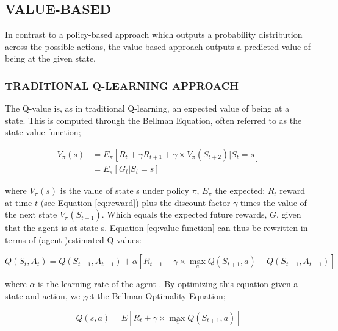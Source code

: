 \documentclass{article}
\let\oldcite\cite
\renewcommand{\cite}[1]{\textbf{\oldcite{#1}}}
\renewenvironment{leftbar}[1][\hsize]{
    \def\FrameCommand{{\color{barcolor}\vrule width 0.5pt \hspace{10pt}}}
    \MakeFramed{\hsize#1 \advance\hsize-\width \FrameRestore}
}{\endMakeFramed}
\begin{document}
\subsection*{\normalsize VALUE-BASED}
\begin{leftbar}
    In contrast to a policy-based approach which outputs a probability distribution across the possible actions, the value-based approach outputs a predicted value of being at the given state. \cite{HF-value}

    \subsubsection*{\hfill TRADITIONAL Q-LEARNING APPROACH}

    The Q-value is, as in traditional Q-learning, an expected value of being at a state. This is computed through the Bellman Equation, often referred to as the state-value function;

    \begin{equation}
        \begin{split}
            V_\pi (s) &= E_\pi \left[ R_t + \gamma R_{t+1} + \gamma \times V_\pi (S_{t+2}) | S_t = s \right] \\
            &= E_\pi \left[ G_t | S_t = s \right]
        \end{split} \label{eq:value-function}
    \end{equation}

    where $V_\pi (s)$ is the value of state s under policy $\pi$, $E_\pi$ the expected: $R_t$ reward at time $t$ (see Equation \eqref{eq:reward}) plus the discount factor $\gamma$ times the value of the next state $V_\pi (S_{t+1})$. Which equals the expected future rewards, $G$, given that the agent is at state s. \cite{HF-bellman} \cite{Q-traditional} Equation \eqref{eq:value-function} can thus be rewritten in terms of (agent-)estimated Q-values:

    \hypertarget{sec:value-based-approach}{}
    \begin{equation}
        Q(S_t, A_t) = Q(S_{t-1}, A_{t-1}) + \alpha \left[ R_{t+1} + \gamma \times \max_a Q(S_{t+1}, a) - Q(S_{t-1}, A_{t-1}) \right] \label{eq:q-star-traditional}
    \end{equation}

    where $\alpha$ is the learning rate of the agent \cite{Q-deep}. By optimizing this equation given a state and action, we get the Bellman Optimality Equation;

    \begin{equation}
        Q(s, a) = E \left[ R_t + \gamma \times \max_a Q(S_{t+1}, a) \right]
    \end{equation}


\end{leftbar}
\end{document}
